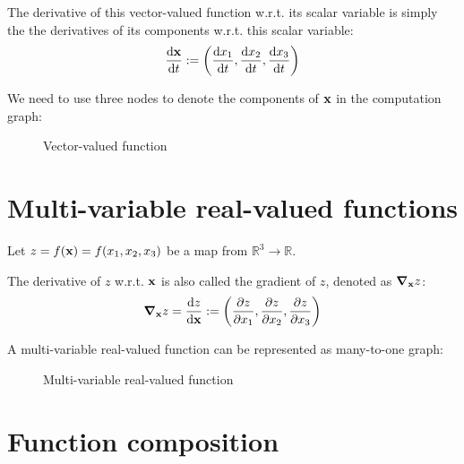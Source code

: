 \documentclass[11pt]{article}
\newcommand{\numset}[1]{\mathbb{#1}}
\begin{document}
The derivative of this vector-valued function w.r.t. its scalar variable is simply the the derivatives of its components w.r.t. this scalar variable:
\begin{align}
	\dv{\vb{x}}{t} := \qty(\dv{x_1}{t}, \dv{x_2}{t}, \dv{x_3}{t})
\end{align}

We need to use three nodes to denote the components of $\vb{x}$ in the computation graph:
\begin{figure}[h]
	\centering
		\caption{Vector-valued function}
	\label{fig:vector-valued-function}
\end{figure}

\section{Multi-variable real-valued functions}
Let $z = f(\vb{x}) = f(x_1, x_2, x_3)$ be a map from $\numset{R}^3 \rightarrow \numset{R}$.

The derivative of $z$ w.r.t. $\vb{x}$ is also called the gradient of $z$, denoted as $\grad_{\vb{x}}{z}$:
\begin{align}
	\grad_{\vb{x}}{z} = \dv{z}{\vb{x}} := \qty(\pdv{z}{x_1}, \pdv{z}{x_2}, \pdv{z}{x_3})
\end{align}

A multi-variable real-valued function can be represented as many-to-one graph:
\begin{figure}[h]
		\centering
		\caption{Multi-variable real-valued function}
		\label{fig:multi-variable-real-valued-function}
\end{figure}

\section{Function composition}
\end{document}
